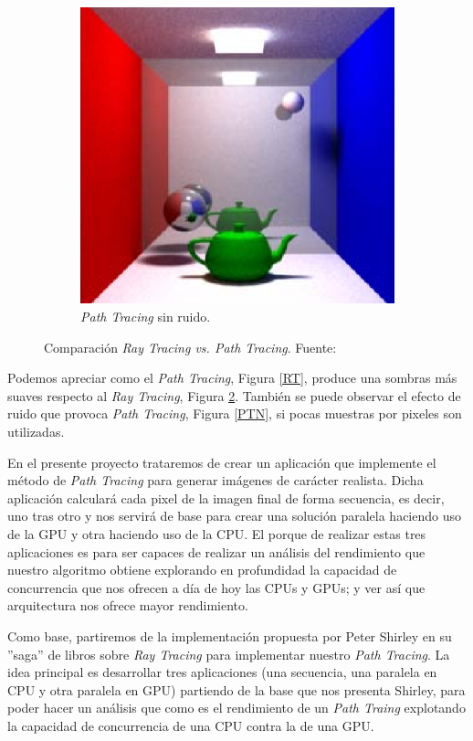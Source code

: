 \documentclass[titlepage,12pt]{article}
\begin{document}
\begin{figure}[H]
\begin{subfigure}{.3\textwidth}
		\includegraphics[width=.8\textwidth]{media/PathTracingMD.png}	
		\caption{\textit{Path Tracing} sin ruido.}
		\label{PT}
	\end{subfigure}
	\caption{Comparación \textit{Ray Tracing vs. Path Tracing}. Fuente: \citep{Cassagnabere2004}}
\end{figure}

Podemos apreciar como el \textit{Path Tracing}, Figura \ref{RT}, produce una sombras más suaves respecto al \textit{Ray Tracing}, Figura \ref{PT}. También se puede observar el efecto de ruido que provoca \textit{Path Tracing}, Figura \ref{PTN}, si pocas muestras por pixeles son utilizadas.

En el presente proyecto trataremos de crear un aplicación que implemente el método de \textit{Path Tracing} para generar imágenes de carácter realista. Dicha aplicación calculará cada pixel de la imagen final de forma secuencia, es decir, uno tras otro y nos servirá de base para crear una solución paralela haciendo uso de la GPU y otra haciendo uso de la CPU. El porque de realizar estas tres aplicaciones es para ser capaces de realizar un análisis del rendimiento que nuestro algoritmo obtiene explorando en profundidad la capacidad de concurrencia que nos ofrecen a día de hoy las CPUs y GPUs; y ver así que arquitectura nos ofrece mayor rendimiento.

Como base, partiremos de la implementación propuesta por Peter Shirley en su ''saga'' de libros sobre \textit{Ray Tracing} \citep{ShirleyRTA, ShirleyRTB, ShirleyRTC} para implementar nuestro \textit{Path Tracing}. La idea principal es desarrollar tres aplicaciones (una secuencia, una paralela en CPU y otra paralela en GPU) partiendo de la base que nos presenta Shirley, para poder hacer un análisis que como es el rendimiento de un \textit{Path Traing} explotando la capacidad de concurrencia de una CPU contra la de una GPU.
\end{document}
